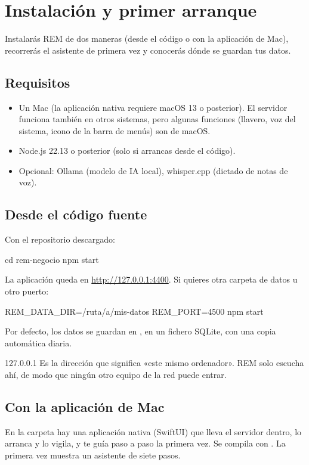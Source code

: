 \chapter{Instalación y primer arranque}\label{cap:instalar}

\begin{objbox}
Instalarás REM de dos maneras (desde el código o con la aplicación de Mac), recorrerás el asistente de primera vez y conocerás dónde se guardan tus datos.
\end{objbox}

\section{Requisitos}
\begin{itemize}
\item Un Mac (la aplicación nativa requiere macOS 13 o posterior). El servidor funciona también en otros sistemas, pero algunas funciones (llavero, voz del sistema, icono de la barra de menús) son de macOS.
\item Node.js 22.13 o posterior (solo si arrancas desde el código).
\item Opcional: Ollama (modelo de IA local), whisper.cpp (dictado de notas de voz).
\end{itemize}

\section{Desde el código fuente}
Con el repositorio descargado:
\begin{codebox}
cd rem-negocio
npm start
\end{codebox}
La aplicación queda en \url{http://127.0.0.1:4400}. Si quieres otra carpeta de datos u otro puerto:
\begin{codebox}
REM_DATA_DIR=/ruta/a/mis-datos REM_PORT=4500 npm start
\end{codebox}
Por defecto, los datos se guardan en , en un fichero SQLite, con una copia automática diaria.

\begin{plainbox}{127.0.0.1}
Es la dirección que significa «este mismo ordenador». REM solo escucha ahí, de modo que ningún otro equipo de la red puede entrar.
\end{plainbox}

\section{Con la aplicación de Mac}
En la carpeta  hay una aplicación nativa (SwiftUI) que lleva el servidor dentro, lo arranca y lo vigila, y te guía paso a paso la primera vez. Se compila con . La primera vez muestra un asistente de siete pasos.

